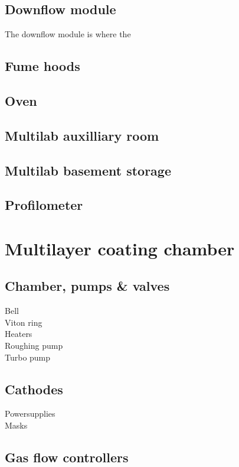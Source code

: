 \subsection{Downflow module}
The downflow module is where the

\subsection{Fume hoods}

\subsection{Oven}

\subsection{Multilab auxilliary room}

\subsection{Multilab basement storage}

\subsection{Profilometer}

\section{Multilayer coating chamber}\label{sec:ml_chamber}

\subsection{Chamber, pumps \& valves}
Bell\\
Viton ring\\
Heaters\\
Roughing pump\\
Turbo pump

\subsection{Cathodes}
Powersupplies\\
Masks\\

\subsection{Gas flow controllers}

